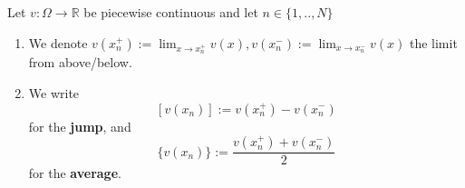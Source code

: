 \begin{definition} 
    Let $v:\Omega \to \mathbb{R}$ be piecewise continuous and let $n \in
    \{1,..,N\}$
    \begin{enumerate}[label=\textnormal{(\roman*)}]
        \item We denote $v(x_n^+) := \lim_{x \to x_n^+} v(x), v(x_n^-) := \lim_{x \to x_n^-} v(x)$
        the limit from above/below.
        \item We write
        \[
            [v(x_n)]:= v(x_n^+) - v(x_n^-)
        \]
        for the \textbf{jump}, and
        \[
            \{v(x_n)\}:= \frac{v(x_n^+) + v(x_n^-)}{2}
        \]
        for the \textbf{average}.
    \end{enumerate}
\end{definition}



